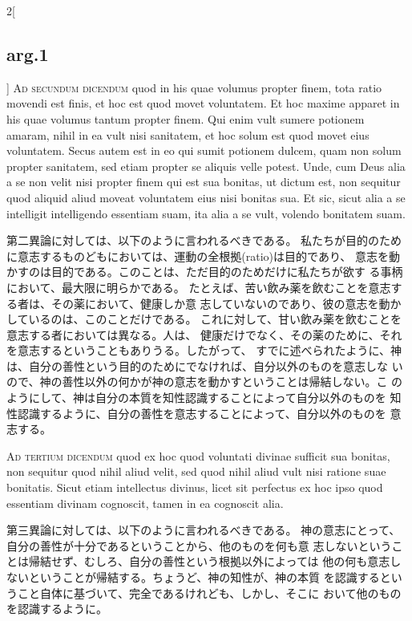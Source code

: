 \documentclass[paper=a4paper,fontsize=10pt,jafontsize=9pt,titlepage]{jlreq}
\begin{document}
\begin{paracol}{2}[\subsection{arg.1}]
{\scshape Ad secundum dicendum} quod in his quae volumus propter finem,
 tota ratio movendi est finis, et hoc est quod movet voluntatem. Et hoc
 maxime apparet in his quae volumus tantum propter finem. Qui enim vult
 sumere potionem amaram, nihil in ea vult nisi sanitatem, et hoc solum
 est quod movet eius voluntatem. Secus autem est in eo qui sumit
 potionem dulcem, quam non solum propter sanitatem, sed etiam propter se
 aliquis velle potest. Unde, cum Deus alia a se non velit nisi propter
 finem qui est sua bonitas, ut dictum est, non sequitur quod aliquid
 aliud moveat voluntatem eius nisi bonitas sua. Et sic, sicut alia a se
 intelligit intelligendo essentiam suam, ita alia a se vult, volendo
 bonitatem suam.

\switchcolumn

第二異論に対しては、以下のように言われるべきである。
私たちが目的のために意志するものどもにおいては、運動の全根拠(ratio)は目的であり、
意志を動かすのは目的である。このことは、ただ目的のためだけに私たちが欲す
 る事柄において、最大限に明らかである。
たとえば、苦い飲み薬を飲むことを意志する者は、その薬において、健康しか意
 志していないのであり、彼の意志を動かしているのは、このことだけである。
これに対して、甘い飲み薬を飲むことを意志する者においては異なる。人は、
 健康だけでなく、その薬のために、それを意志するということもありうる。したがって、
すでに述べられたように、神は、自分の善性という目的のためにでなければ、自分以外のものを意志しな
 いので、神の善性以外の何かが神の意志を動かすということは帰結しない。こ
 のようにして、神は自分の本質を知性認識することによって自分以外のものを
 知性認識するように、自分の善性を意志することによって、自分以外のものを
 意志する。

\switchcolumn*[\subsection{ad.3}]


{\scshape Ad tertium dicendum} quod ex hoc quod voluntati divinae
 sufficit sua bonitas, non sequitur quod nihil aliud velit, sed quod
 nihil aliud vult nisi ratione suae bonitatis. Sicut etiam intellectus
 divinus, licet sit perfectus ex hoc ipso quod essentiam divinam
 cognoscit, tamen in ea cognoscit alia.

\switchcolumn

第三異論に対しては、以下のように言われるべきである。
神の意志にとって、自分の善性が十分であるということから、他のものを何も意
 志しないということは帰結せず、むしろ、自分の善性という根拠以外によっては
 他の何も意志しないということが帰結する。ちょうど、神の知性が、神の本質
 を認識するということ自体に基づいて、完全であるけれども、しかし、そこに
 おいて他のものを認識するように。


\end{paracol}
\end{document}
